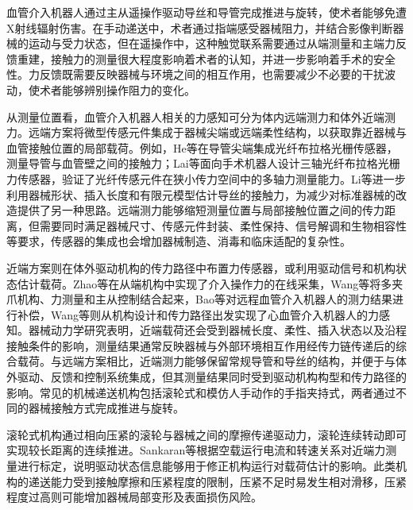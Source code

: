 \documentclass{JQR_LaTeX_Template-0507/JQRnew}
\begin{document}
\maketitle

\makeatletter
{}
\makeatother
血管介入机器人通过主从遥操作驱动导丝和导管完成推进与旋转，使术者能够免遭X射线辐射伤害。在手动递送中，术者通过指端感受器械阻力，并结合影像判断器械的运动与受力状态，但在遥操作中，这种触觉联系需要通过从端测量和主端力反馈重建，接触力的测量很大程度影响着术者的认知，并进一步影响着手术的安全性。力反馈既需要反映器械与环境之间的相互作用，也需要减少不必要的干扰波动，使术者能够辨别操作阻力的变化。

 从测量位置看，血管介入机器人相关的力感知可分为体内远端测力和体外近端测力。远端方案将微型传感元件集成于器械尖端或远端柔性结构，以获取靠近器械与血管接触位置的局部载荷。例如，He等在导管尖端集成光纤布拉格光栅传感器，测量导管与血管壁之间的接触力；Lai等面向手术机器人设计三轴光纤布拉格光栅力传感器，验证了光纤传感元件在狭小传力空间中的多轴力测量能力。Li等进一步利用器械形状、插入长度和有限元模型估计导丝的接触力，为减少对标准器械的改造提供了另一种思路。远端测力能够缩短测量位置与局部接触位置之间的传力距离，但需要同时满足器械尺寸、传感元件封装、柔性保持、信号解调和生物相容性等要求，传感器的集成也会增加器械制造、消毒和临床适配的复杂性。

 近端方案则在体外驱动机构的传力路径中布置力传感器，或利用驱动信号和机构状态估计载荷。Zhao等在从端机构中实现了介入操作力的在线采集，Wang等将多夹爪机构、力测量和主从控制结合起来，Bao等对远程血管介入机器人的测力结果进行补偿，Wang等则从机构设计和传力路径出发实现了心血管介入机器人的力感知。器械动力学研究表明，近端载荷还会受到器械长度、柔性、插入状态以及沿程接触条件的影响，测量结果通常反映器械与外部环境相互作用经传力链传递后的综合载荷。与远端方案相比，近端测力能够保留常规导管和导丝的结构，并便于与体外驱动、反馈和控制系统集成，但其测量结果同时受到驱动机构构型和传力路径的影响。常见的机械递送机构包括滚轮式和模仿人手动作的手指夹持式，两者通过不同的器械接触方式完成推进与旋转。

 滚轮式机构通过相向压紧的滚轮与器械之间的摩擦传递驱动力，滚轮连续转动即可实现较长距离的连续推进。Sankaran等根据空载运行电流和转速关系对近端力测量进行标定，说明驱动状态信息能够用于修正机构运行对载荷估计的影响。此类机构的递送能力受到接触摩擦和压紧程度的限制，压紧不足时易发生相对滑移，压紧程度过高则可能增加器械局部变形及表面损伤风险。
\end{document}
